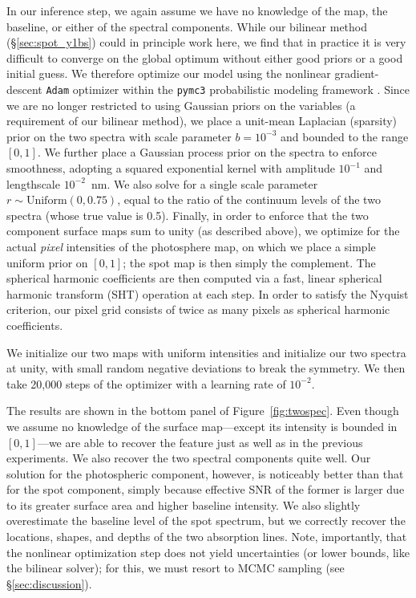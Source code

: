 \documentclass[modern]{aastex631}
\begin{document}
In our inference step, we again assume we have no knowledge of the map, the baseline, or either of the spectral components. While our bilinear method (\S\ref{sec:spot_y1bs}) could in principle work here, we find that in practice it is very difficult to converge on the global optimum without either good priors or a good initial guess.
We therefore optimize our model using the nonlinear gradient-descent \texttt{Adam} optimizer \citep{Adam} within the \texttt{pymc3} probabilistic modeling framework \citep{Salvatier2016}. Since we are no longer restricted to using Gaussian priors on the variables (a requirement of our bilinear method), we place a unit-mean Laplacian (sparsity) prior on the two spectra with scale parameter $b = 10^{-3}$ and bounded to the range $[0, 1]$.
%
We further place a Gaussian process prior on the spectra to enforce smoothness, adopting a squared exponential kernel with amplitude $10^{-1}$ and lengthscale $10^{-2}$~nm.
%
We also solve for a single scale parameter $r \sim \mathrm{Uniform}(0, 0.75)$, equal to the ratio of the continuum levels of the two spectra (whose true value is 0.5).
Finally, in order to enforce that the two component surface maps sum to unity (as described above), we optimize for the actual \emph{pixel} intensities of the photosphere map, on which we place a simple uniform prior on $[0, 1]$; the spot map is then simply the complement. The spherical harmonic coefficients are then computed via a fast, linear spherical harmonic transform (SHT) operation at each step. In order to satisfy the Nyquist criterion, our pixel grid consists of twice as many pixels as spherical harmonic coefficients.

We initialize our two maps with uniform intensities and initialize our two spectra at unity, with small random negative deviations to break the symmetry.
We then take 20,000 steps of the optimizer with a learning rate of $10^{-2}$.

The results are shown in the bottom panel of Figure~\ref{fig:twospec}.
Even though we assume no knowledge of the surface map---except its intensity is bounded in $[0, 1]$---we are able to recover the \spot feature just as well as in the previous experiments.
We also recover the two spectral components quite well. Our solution for the photospheric component, however, is noticeably better than that for the spot component, simply because effective SNR of the former is larger due to its greater surface area and higher baseline intensity. We also slightly overestimate the baseline level of the spot spectrum, but we correctly recover the locations, shapes, and depths of the two absorption lines. Note, importantly, that the nonlinear optimization step does not yield uncertainties (or lower bounds, like the bilinear solver); for this, we must resort to MCMC sampling (see \S\ref{sec:discussion}).
\end{document}
